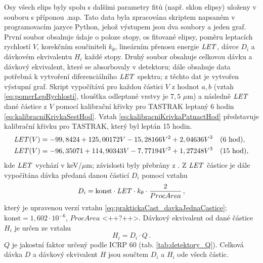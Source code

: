 Osy všech elips byly spolu s dalšími parametry fitů (např. sklon elipsy) uloženy v souboru s příponou .nap. Tato data byla zpracována skriptem napsaném v programovacím jazyce Python, jehož výstupem jsou dva soubory a jeden graf. První soubor obsahuje údaje o poloze stopy, os fitované elipsy, poměru leptacích rychlostí $V$, korekčním součiniteli $k_{\theta}$, lineárním přenosu energie $\mathit{LET}$, dávce $D_i$ a dávkovém ekvivalentu $H_i$ každé stopy. Druhý soubor obsahuje celkovou dávku a dávkový ekvivalent, které se absorbovaly v detektoru; dále obsahuje data potřebná k vytvoření diferenciálního $\mathit{LET}$ spektra; z těchto dat je vytvořen výstupní graf. Skript vypočítává pro každou částici $V$ z hodnot $a,b$ (vztah \eqref{eq:pomerLepRychlosti}, tloušťka odleptané vrstvy je $7,5$
$\mu$m) a následně $\mathit{LET}$ dané částice z $V$ pomocí kalibrační křivky pro TASTRAK leptaný 6 hodin \eqref{eq:kalibracniKrivkaSestHod}. Vztah \eqref{eq:kalibracniKrivkaPatnactHod} představuje kalibrační křivku pro TASTRAK, který byl leptán 15 hodin.
\begin{align}
  \mathit{LET}(V) &= -99,8424+125,00172  V-15,28166  V^2+2,04636  V^3\quad\text{(6 hod)},\label{eq:kalibracniKrivkaSestHod}\\
  \mathit{LET}(V) &= -96,35071+114,90343  V-7,77194  V^2+1,27248  V^3\quad\text{(15 hod)},\label{eq:kalibracniKrivkaPatnactHod}
\end{align}
kde $\mathit{LET}$ vychází v keV/$\mu$m; závislosti byly přebrány z \cite{ssntd}. Z $\mathit{LET}$ částice je dále vypočítána dávka předaná danou částicí $D_i$ pomocí vztahu
\begin{equation}
  D_i=\text{konst}\cdot\mathit{LET}\cdot k_{\theta}\cdot\frac{2}{ProcArea}\,, 
  \label{eq:praktickaCast_davkaJednaCastice}
\end{equation}
který je upravenou verzí vztahu \eqref{eq:praktickaCast_davkaJednaCastice}; $\text{konst}=1,602\cdot 10^{-6}$, $ProcArea$ <++?++>. Dávkový ekvivalent od dané částice $H_i$ je určen ze vztahu 
\begin{equation}
  H_i=D_i\cdot Q\,.
  \label{eq:praktickaCast_ekvDavkaJednaCastice}
\end{equation}
$Q$ je jakostní faktor určený podle ICRP 60 (tab. \ref{tab:detektory_Q}). Celková dávka $D$ a dávkový ekvivalent $H$ jsou součtem $D_i$ a $H_i$ ode všech částic. 

